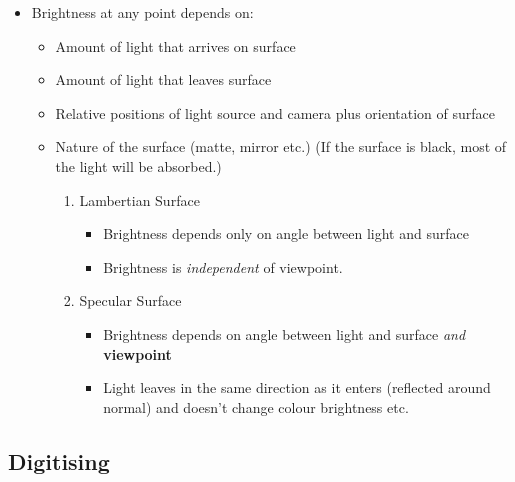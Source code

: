 \documentclass[english, 10pt]{article}
\begin{document}
\begin{itemize}
\itemsep1pt\parskip0pt
\item
  Brightness at any point depends on:

  \begin{itemize}
  \itemsep1pt\parskip0pt
  \item
    Amount of light that arrives on surface
  \item
    Amount of light that leaves surface
  \item
    Relative positions of light source and camera plus orientation of
    surface
  \item
    Nature of the surface (matte, mirror etc.) (If the surface is black,
    most of the light will be absorbed.)

    \begin{enumerate}
    \def\labelenumi{\arabic{enumi}.}
    \itemsep1pt\parskip0pt
    \item
      Lambertian Surface

      \begin{itemize}
      \itemsep1pt\parskip0pt
      \item
        Brightness depends only on angle between light and surface
      \item
        Brightness is \emph{independent} of viewpoint.
      \end{itemize}
    \item
      Specular Surface

      \begin{itemize}
      \itemsep1pt\parskip0pt
      \item
        Brightness depends on angle between light and surface \emph{and}
        \textbf{viewpoint}
      \item
        Light leaves in the same direction as it enters (reflected
        around normal) and doesn't change colour brightness etc.
      \end{itemize}
    \end{enumerate}
  \end{itemize}
\end{itemize}

\subsection{Digitising}\label{digitising}
\end{document}

